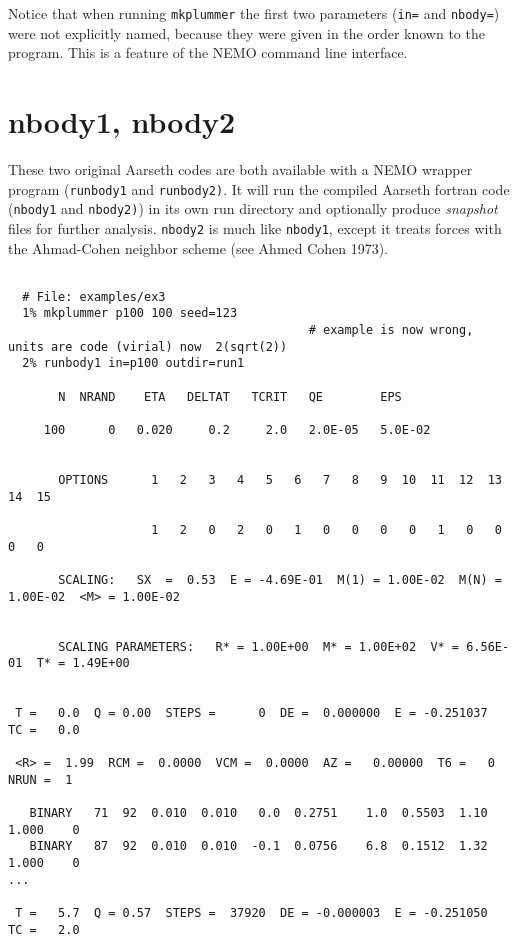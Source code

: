 {{\begin{verbatim}
\end{verbatim}\normalsize

Notice that when running {\tt mkplummer} the first two parameters ({\tt in=} and {\tt nbody=})
were not explicitly named, because they were given in the order known to the program. This is a feature of the NEMO command line interface.


\section{nbody1, nbody2}

These two original Aarseth codes are both available with a NEMO wrapper program
({\tt runbody1} and {\tt runbody2)}. It will run the compiled Aarseth fortran 
code ({\tt nbody1} and {\tt nbody2)})
in its own run directory and 
optionally produce {\it snapshot} files for further
analysis. {\tt nbody2}  is much like {\tt nbody1}, except it
treats forces with the Ahmad-Cohen neighbor scheme (see Ahmed Cohen 1973).

\footnotesize\begin{verbatim}

  # File: examples/ex3
  1% mkplummer p100 100 seed=123
                                          # example is now wrong, units are code (virial) now  2(sqrt(2))
  2% runbody1 in=p100 outdir=run1 

       N  NRAND    ETA   DELTAT   TCRIT   QE        EPS

     100      0   0.020     0.2     2.0   2.0E-05   5.0E-02
 
 
       OPTIONS      1   2   3   4   5   6   7   8   9  10  11  12  13  14  15

                    1   2   0   2   0   1   0   0   0   0   1   0   0   0   0
 
       SCALING:   SX  =  0.53  E = -4.69E-01  M(1) = 1.00E-02  M(N) = 1.00E-02  <M> = 1.00E-02
 

       SCALING PARAMETERS:   R* = 1.00E+00  M* = 1.00E+02  V* = 6.56E-01  T* = 1.49E+00
 
 
 T =   0.0  Q = 0.00  STEPS =      0  DE =  0.000000  E = -0.251037  TC =   0.0
 
 <R> =  1.99  RCM =  0.0000  VCM =  0.0000  AZ =   0.00000  T6 =   0  NRUN =  1
 
   BINARY   71  92  0.010  0.010   0.0  0.2751    1.0  0.5503  1.10  1.000    0
   BINARY   87  92  0.010  0.010  -0.1  0.0756    6.8  0.1512  1.32  1.000    0
...
 
 T =   5.7  Q = 0.57  STEPS =  37920  DE = -0.000003  E = -0.251050  TC =   2.0
 

\end{verbatim}}}
